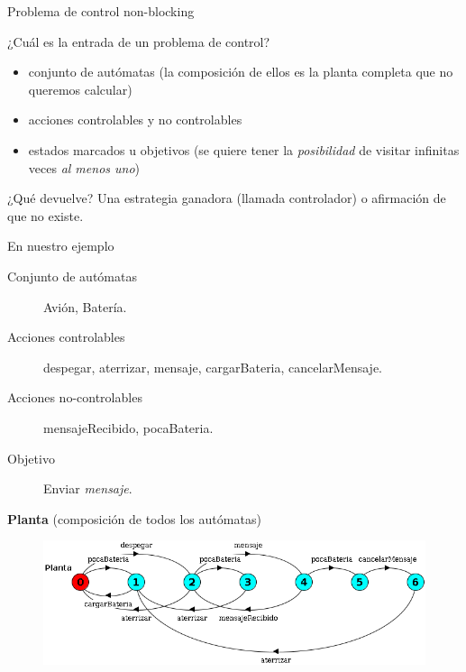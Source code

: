 \begin{frame}{Problema de control non-blocking}
    \begin{block}{¿Cuál es la entrada de un problema de control?}
        \begin{itemize}
          \item conjunto de autómatas (la composición de ellos es la planta completa que no queremos calcular)
          \item acciones controlables y no controlables
          \item estados marcados u objetivos (se quiere tener la \textit{posibilidad} de visitar infinitas veces \textit{al menos uno})
        \end{itemize}
    \end{block}

    \begin{block}{¿Qué devuelve?}
        Una estrategia ganadora (llamada controlador) o afirmación de que no existe.
    \end{block}

\end{frame}
\begin{frame}{En nuestro ejemplo}
    \begin{description}
     \item[Conjunto de autómatas] Avión, Batería.
     \item[Acciones controlables] despegar, aterrizar, mensaje, cargarBateria, cancelarMensaje.
     \item[Acciones no-controlables] mensajeRecibido, pocaBateria.
     \item[Objetivo] Enviar \textit{mensaje}.
    \end{description}
    
    \textbf{Planta} (composición de todos los autómatas)
    \begin{figure}
     \includegraphics[width=\textwidth]{figures/planta.png}
    \end{figure}
    
\end{frame}
